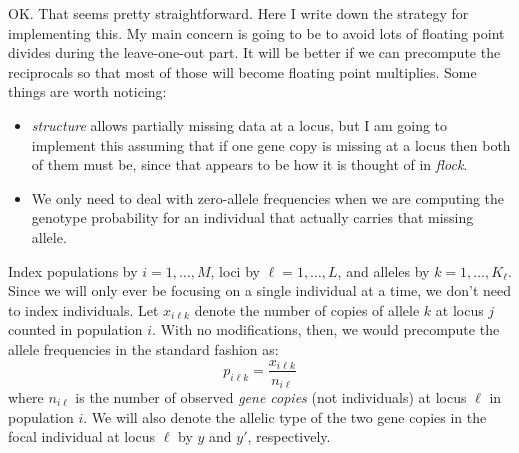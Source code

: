 \documentclass[11pt]{article}
\begin{document}
OK.  That seems pretty straightforward.  Here I write down the strategy for implementing this.  My main concern is going
to be to avoid lots of floating point divides during the leave-one-out part.  It will be better if we can precompute the reciprocals
so that most of those will become floating point multiplies. Some things are worth noticing:
\begin{itemize}
\item {\em structure} allows partially missing data at a locus, but I am going to implement this assuming that if one gene copy is missing at a locus
then both of them must be, since that appears to be how it is thought of in {\em flock}.
\item We only need to deal with zero-allele frequencies when we are computing the genotype probability for an individual that actually carries
that missing allele.
\end{itemize}

Index populations by $i = 1,\ldots, M$, loci by $\ell = 1,\ldots,L$, and alleles by $k = 1,\ldots, K_\ell$. Since we will only ever be focusing on
a single individual at a time, we don't need to index individuals.  Let $x_{i\ell k}$ denote the number of copies of allele $k$ at locus $j$ counted in population $i$.  With no modifications, then, we would precompute the allele frequencies in the standard fashion as:
\[
p_{i\ell k} = \frac{x_{i\ell k}}{n_{i\ell}}
\]
where $n_{i\ell}$ is the number of observed {\em gene copies} (not individuals) at locus $\ell$ in population $i$.  We will also denote the allelic type
of the two gene copies in the focal individual at locus $\ell$ by $y$ and $y'$, respectively.
\end{document}
